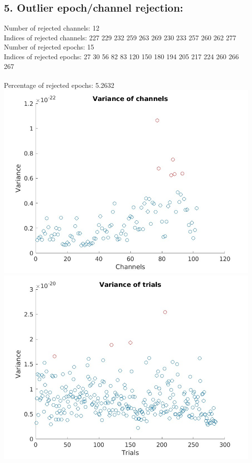 \documentclass[10pt,a4paper,oneside]{report}
\begin{document}
\subsection*{5. Outlier epoch/channel rejection:}
Number of rejected channels: 12 
\\ Indices of rejected channels: 227  229  232  259  263  269  230  233  257  260  262  277 
\\ Number of rejected epochs: 15 
\\ Indices of rejected epochs: 27   30   56   82   83  120  150  180  194  205  217  224  260  266  267\\ 
\\ Percentage of rejected epochs: 5.2632\\ 
\includegraphics[width=14cm]{bad_channels.jpg}\\
\includegraphics[width=14cm]{bad_trials.jpg}\\
\end{document}
